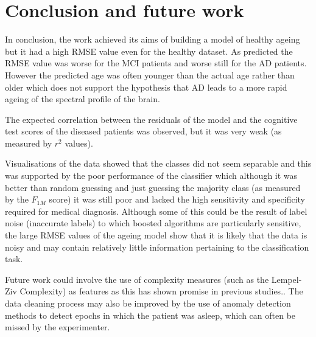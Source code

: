 \chapter{Conclusion and future work}

In conclusion, the work achieved its aims of building a model of healthy ageing but it had a high RMSE value even for the healthy dataset. As predicted the RMSE value was worse for the MCI patients and worse still for the AD patients. However the predicted age was often younger than the actual age rather than older which does not support the hypothesis that AD leads to a more rapid ageing of the spectral profile of the brain. 

The expected correlation between the residuals of the model and the cognitive test scores of the diseased patients was observed, but it was very weak (as measured by $r^2$ values).

Visualisations of the data showed that the classes did not seem separable and this was supported by the poor performance of the classifier which although it was better than random guessing and just guessing the majority class (as measured by the $F_{1M}$ score) it was still poor and lacked the high sensitivity and specificity required for medical diagnosis. Although some of this could be the result of label noise (inaccurate labels) to which boosted algorithms are particularly sensitive, the large RMSE values of the ageing model show that it is likely that the data is noisy and may contain relatively little information pertaining to the classification task.

Future work could involve the use of complexity measures (such as the Lempel-Ziv Complexity) as features as this has shown promise in previous studies.\cite{Hornero2008}\cite{Fernandez2012}. The data cleaning process may also be improved by the use of anomaly detection methods\cite{Chandola2009} to detect epochs in which the patient was asleep, which can often be missed by the experimenter.  
